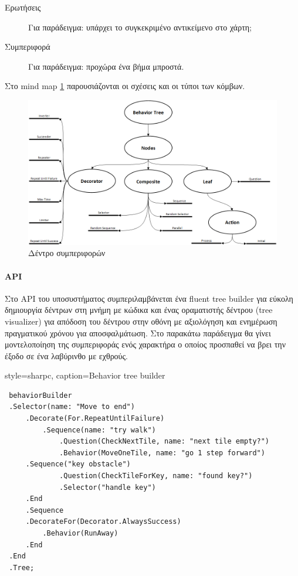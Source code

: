 \begin{description}
	\item [Ερωτήσεις] Για παράδειγμα: υπάρχει το συγκεκριμένο αντικείμενο στο χάρτη;
	\item [Συμπεριφορά] Για παράδειγμα: προχώρα ένα βήμα μπροστά.
\end{description}

Στο mind map \ref{fig:behavior_trees_mind_map} παρουσιάζονται οι σχέσεις και οι τύποι των κόμβων.
\begin{figure}[h!]
	\centering
	\includegraphics[width=165mm]{Images/behavior_trees}
	\caption{Δέντρο συμπεριφορών}
	\label{fig:behavior_trees_mind_map}
\end{figure}
	
\paragraph{API}
Στο \gls{API} του υποσυστήματος συμπεριλαμβάνεται ένα fluent tree builder για εύκολη δημιουργία δέντρων στη μνήμη με κώδικα και ένας οραματιστής δέντρου (tree visualizer) για απόδοση του δέντρου στην οθόνη με αξιολόγηση και ενημέρωση πραγματικού χρόνου για αποσφαλμάτωση. Στο παρακάτω παράδειγμα θα γίνει μοντελοποίηση της συμπεριφοράς ενός χαρακτήρα ο οποίος προσπαθεί να βρει την έξοδο σε ένα λαβύρινθο με εχθρούς.

	\lstset
	{
		style=sharpc, 
		caption={Behavior tree builder}
	}
	\begin{lstlisting}	
 behaviorBuilder
 .Selector(name: "Move to end")
	 .Decorate(For.RepeatUntilFailure)
		 .Sequence(name: "try walk")
			 .Question(CheckNextTile, name: "next tile empty?")
			 .Behavior(MoveOneTile, name: "go 1 step forward")
	 .Sequence("key obstacle")
			 .Question(CheckTileForKey, name: "found key?")
			 .Selector("handle key")
	 .End
	 .Sequence
	 .DecorateFor(Decorator.AlwaysSuccess)
		 .Behavior(RunAway)
	 .End
 .End
 .Tree;
	\end{lstlisting}


